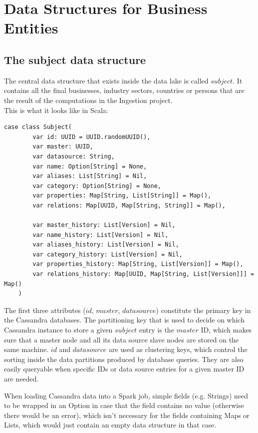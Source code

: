 \documentclass[
        a4paper,     %
        titlepage,   %
        oneside,     %
        parskip      %
]{scrartcl}          %
\begin{document}
  \section{Data Structures for Business Entities}
    \subsection{The subject data structure}
    \label{sec:subject_structure}
    The central data structure that exists inside the data lake is called $subject$.
    It contains all the final businesses, industry sectors, countries or persons
    that are the result of the computations in the Ingestion project.\\

    This is what it looks like in Scala:
    \begin{lstlisting}[style=scalaStyle,caption=Subject]
    case class Subject(
    	var id: UUID = UUID.randomUUID(),
    	var master: UUID,
    	var datasource: String,
    	var name: Option[String] = None,
    	var aliases: List[String] = Nil,
    	var category: Option[String] = None,
    	var properties: Map[String, List[String]] = Map(),
    	var relations: Map[UUID, Map[String, String]] = Map(),

    	var master_history: List[Version] = Nil,
    	var name_history: List[Version] = Nil,
    	var aliases_history: List[Version] = Nil,
    	var category_history: List[Version] = Nil,
    	var properties_history: Map[String, List[Version]] = Map(),
    	var relations_history: Map[UUID, Map[String, List[Version]]] = Map()
    )
    \end{lstlisting}

    The first three attributes ($id$, $master$, $datasource$) constitute the
    primary key in the Cassandra databases.
    The partitioning key that is used to decide on which Cassandra instance to store
    a given $subject$ entry is the $master$ ID, which makes sure that a master node
    and all its data source slave nodes are stored on the same machine.
    $id$ and $datasource$ are used as clustering keys, which control the sorting
    inside the data partitions produced by database queries. They are also easily
    queryable when specific IDs or data source entries for a given master ID are
    needed.

    When loading Cassandra data into a Spark job, simple fields (e.g. Strings)
    need to be wrapped in an Option in case that the field contains no value
    (otherwise there would be an error), which isn't necessary for the fields
    containing Maps or Lists, which would just contain an empty data structure
    in that case.
\end{document}
